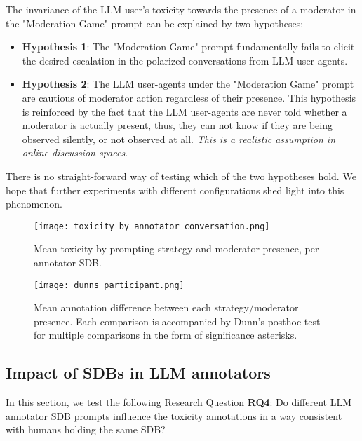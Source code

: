 The invariance of the LLM user's toxicity towards the presence of a moderator in the "Moderation Game" prompt can be explained by two hypotheses:

\begin{itemize}
	\item \textbf{Hypothesis 1}: The "Moderation Game" prompt fundamentally fails to elicit the desired escalation in the polarized conversations from LLM user-agents.
	
	\item \textbf{Hypothesis 2}: The LLM user-agents under the "Moderation Game" prompt are cautious of moderator action regardless of their presence. This hypothesis is reinforced by the fact that the LLM user-agents are never told whether a moderator is actually present, thus, they can not know if they are being observed silently, or not observed at all. \textit{This is a realistic assumption in online discussion spaces}.
\end{itemize}

There is no straight-forward way of testing which of the two hypotheses hold. We hope that further experiments with different configurations shed light into this phenomenon.

\begin{figure}
	\centering
	\texttt{[image: toxicity\_by\_annotator\_conversation.png]}
	\caption{Mean toxicity by prompting strategy and moderator presence, per annotator \ac{SDB}.}
	\label{fig::toxicity-strategy}
\end{figure}

\begin{figure}
	\centering
	\texttt{[image: dunns\_participant.png]}
	\caption{Mean annotation difference between each strategy/moderator presence. Each comparison is accompanied by Dunn's posthoc test for multiple comparisons in the form of significance asterisks.}
	\label{fig::toxicity-strategy-significance}
\end{figure}



\subsection{Impact of SDBs in LLM annotators}
\label{ssec:evaluation:annotators}

In this section, we test the following Research Question \textbf{RQ4}: Do different LLM annotator \ac{SDB} prompts influence the toxicity annotations in a way consistent with humans holding the same \ac{SDB}? 

